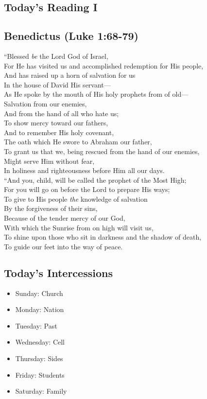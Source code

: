 \documentclass[14pt]{extbook}
\begin{document}
\newpage
\subsection{Today's Reading I}

\hypertarget{benedictus-luke-168-79}{%
\subsection{Benedictus (Luke 1:68-79)}\label{benedictus-luke-168-79}}

``Blessed \emph{be} the Lord God of Israel,\\
For He has visited us and accomplished redemption for His people,\\
And has raised up a horn of salvation for us\\
In the house of David His servant---\\
As He spoke by the mouth of His holy prophets from of old---\\
Salvation from our enemies,\\
And from the hand of all who hate us;\\
To show mercy toward our fathers,\\
And to remember His holy covenant,\\
The oath which He swore to Abraham our father,\\
To grant us that we, being rescued from the hand of our enemies,\\
Might serve Him without fear,\\
In holiness and righteousness before Him all our days.\\
``And you, child, will be called the prophet of the Most High;\\
For you will go on before the Lord to prepare His ways;\\
To give to His people \emph{the} knowledge of salvation\\
By the forgiveness of their sins,\\
Because of the tender mercy of our God,\\
With which the Sunrise from on high will visit us,\\
To shine upon those who sit in darkness and the shadow of death,\\
To guide our feet into the way of peace.

\hypertarget{today-intercessions}{%
\subsection{Today's Intercessions}\label{today-intercessions}}
\begin{itemize}
\item Sunday: Church
\item Monday: Nation
\item Tuesday: Past
\item Wednesday: Cell
\item Thursday: Sides
\item Friday: Students
\item Saturday: Family
\end{itemize}
\end{document}
